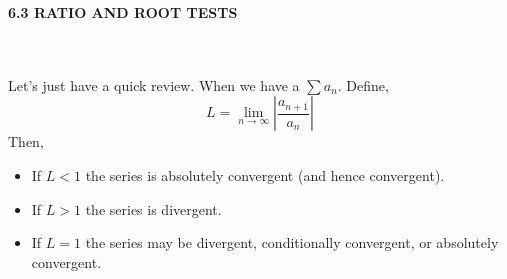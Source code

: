 \documentclass[fleqn]{article}
\begin{document}
\begin{enumerate}
\begin{enumerate}
          

    \end{enumerate}


 
  \end{enumerate}


  \textbf{6.3 RATIO AND ROOT TESTS}

    \textcolor{hwColor}{
      \\
      \\
      Let's just have a quick review. When we have a $\sum a_n$. Define,
      $$
        L=\lim\limits_{n \to \infty} |\dfrac{a_{n+1}}{a_n}|
      $$
      Then,
      \\
      \begin{itemize}
        \item If $L<1$ the series is absolutely convergent (and hence convergent).
        \item If $L>1$ the series is divergent.
        \item If $L=1$ the series may be divergent, conditionally convergent, or absolutely convergent.
      \end{itemize}
    }
\end{document}
